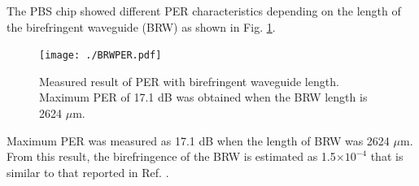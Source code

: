 \documentclass[letterpaper, 10pt]{article}
\begin{document}
The PBS chip showed different PER characteristics depending on the length of the birefringent waveguide (BRW) as shown in Fig. \ref{fig:BRW-PER}.
\begin{figure}
  \centering
  \texttt{[image: ./BRWPER.pdf]}
  \caption{Measured result of PER with birefringent waveguide length. Maximum PER of 17.1 dB was obtained when the BRW length is 2624 $\mu$m.}
  \label{fig:BRW-PER}
\end{figure}
Maximum PER was measured as 17.1 dB  when the length of BRW was 2624 $\mu$m.
From this result, the birefringence of the BRW is estimated as 1.5$\times 10^{-4}$ that is similar to that reported in Ref. \cite{Hashizume:2015ta}.

\end{document}
